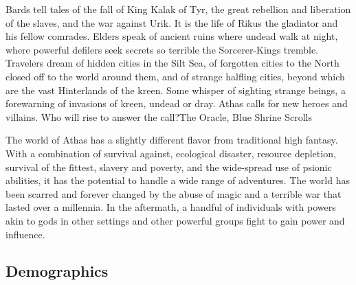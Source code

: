 {Bards tell tales of the fall of King Kalak of Tyr, the great rebellion and liberation of the slaves, and the war against Urik. It is the life of Rikus the gladiator and his fellow comrades. Elders speak of ancient ruins where undead walk at night, where powerful defilers seek secrets so terrible the Sorcerer-Kings tremble. Travelers dream of hidden cities in the Silt Sea, of forgotten cities to the North closed off to the world around them, and of strange halfling cities, beyond which are the vast Hinterlands of the kreen. Some whisper of sighting strange beings, a forewarning of invasions of kreen, undead or dray. Athas calls for new heroes and villains. Who will rise to answer the call?}{The Oracle, Blue Shrine Scrolls}

The world of Athas has a slightly different flavor from traditional high fantasy. With a combination of survival against, ecological disaster, resource depletion, survival of the fittest, slavery and poverty, and the wide-spread use of psionic abilities, it has the potential to handle a wide range of adventures. The world has been scarred and forever changed by the abuse of magic and a terrible war that lasted over a millennia. In the aftermath, a handful of individuals with powers akin to gods in other settings and other powerful groups fight to gain power and influence.

\subsection{Demographics}


